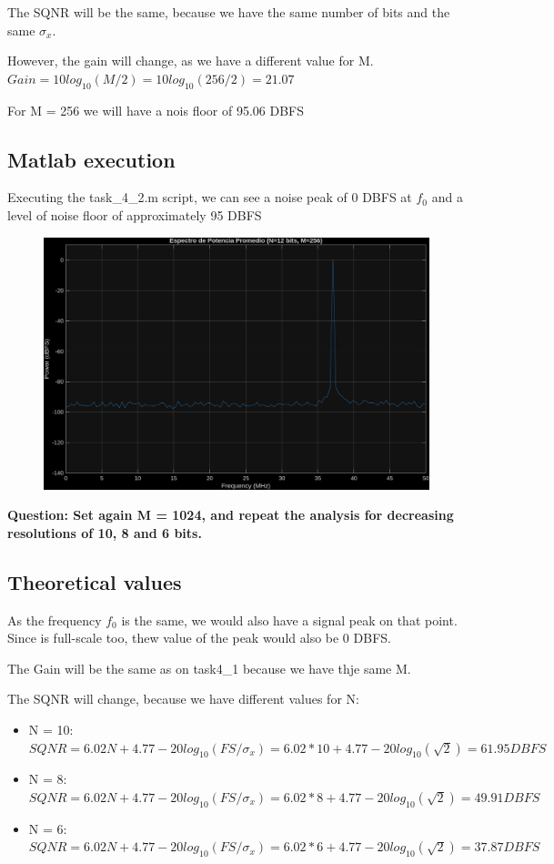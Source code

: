 The SQNR will be the same, because we have the same number of bits and the same $\sigma_x$.

However, the gain will change, as we have a different value for M.
$Gain = 10log_{10}(M/2) = 10log_{10}(256/2) = 21.07$

For M = 256 we will have a nois floor of 95.06 DBFS

\subsection{Matlab execution}
Executing the task\_4\_2.m script, we can see a noise peak of 0 DBFS at $f_0$ and a level of noise floor
of approximately 95 DBFS
\begin{figure}[H]
    \centering
    \includegraphics[width=1\textwidth]{img/task4_2.png}
    \label{fig:task4_2}
\end{figure}
\vspace{1cm}

\textbf{Question: Set again M = 1024, and repeat the analysis for decreasing resolutions of 10, 8 and 6 bits.}
\subsection{Theoretical values}

As the frequency $f_0$ is the same, we would also have a signal peak on that point.
Since is full-scale too, thew value of the peak would also be 0 DBFS.

The Gain will be the same as on task4\_1 because we have thje same M.

The SQNR will change, because we have different values for N:
\begin{itemize}
    \item N = 10: $SQNR = 6.02N +4.77 -20log_{10}(FS/\sigma_x) = 6.02 * 10 +4.77 -20log_{10}(\sqrt{2}) = 61.95 DBFS$
    \item N = 8: $SQNR = 6.02N +4.77 -20log_{10}(FS/\sigma_x) = 6.02 * 8 +4.77 -20log_{10}(\sqrt{2}) = 49.91 DBFS$
    \item N = 6: $SQNR = 6.02N +4.77 -20log_{10}(FS/\sigma_x) = 6.02 * 6 +4.77 -20log_{10}(\sqrt{2}) = 37.87 DBFS$
\end{itemize}

